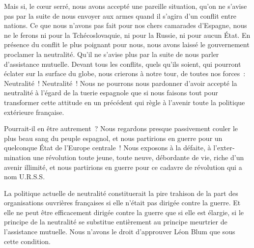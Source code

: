 \documentclass[french,twoside]{book} %
\begin{document}
Mais si, le cœur serré, nous avons accepté une pareille situation, qu'on ne s'avise pas par la suite de nous envoyer aux armes quand il s'agira d'un conflit entre nations. Ce que nous n'avons pas fait pour nos chers camarades d'Espagne, nous ne le ferons ni pour la Tchécoslovaquie, ni pour la Russie, ni pour aucun État. En présence du conflit le plus poignant pour nous, nous avons laissé le gouvernement proclamer la neutralité. Qu'il ne s'avise plus par la suite de nous parler d'assistance mutuelle. Devant tous les conflits, quels qu'ils soient, qui pourront éclater sur la surface du globe, nous crierons à notre tour, de toutes nos forces : Neutralité ! Neutralité ! Nous ne pourrons nous pardonner d'avoir accepté la neutralité à l'égard de la tuerie espagnole que si nous faisons tout pour transformer cette attitude en un précédent qui règle à l'avenir toute la politique extérieure française.\par
Pourrait-il en être autrement ? Nous regardons presque passivement couler le plus beau sang du peuple espagnol, et nous partirions en guerre pour un quelconque État de l'Europe centrale ! Nous exposons à la défaite, à l'exter­mination une révolution toute jeune, toute neuve, débordante de vie, riche d'un avenir illimité, et nous partirions en guerre pour ce cadavre de révolution qui a nom U.R.S.S.\par
La politique actuelle de neutralité constituerait la pire trahison de la part des organisations ouvrières françaises si elle n'était pas dirigée contre la guerre. Et elle ne peut être efficacement dirigée contre la guerre que si elle est élargie, si le principe de la neutralité se substitue entièrement au principe meurtrier de l'assistance mutuelle. Nous n'avons le droit d'approuver Léon Blum que sous cette condition.\par

\begin{center}
\end{center}
\end{document}
